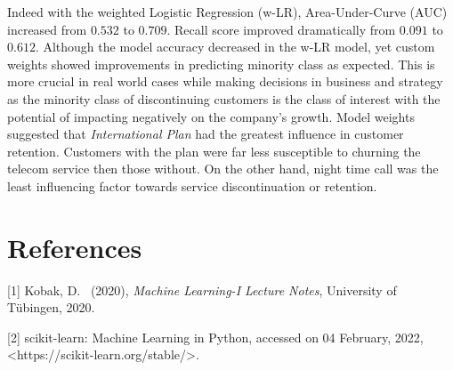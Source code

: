 \documentclass{article}
\begin{document}
Indeed with the weighted Logistic Regression (w-LR), Area-Under-Curve (AUC) increased from $0.532$ to $0.709$. Recall score improved dramatically from $0.091$ to $0.612$. Although the model accuracy decreased in the w-LR model, yet custom weights showed improvements in predicting minority class as expected. This is more crucial in real world cases while making decisions in business and strategy as the minority class of discontinuing customers is the class of interest with the potential of impacting negatively on the company's growth. Model weights suggested that \textit{International Plan} had the greatest influence in customer retention. Customers with the plan were far less susceptible to churning the telecom service then those without. On the other hand, night time call was the least influencing factor towards service discontinuation or retention.

\section*{References}

{
	\small
	
	[1] Kobak, D. \ (2020), \textit{Machine Learning-I Lecture Notes}, University of Tübingen, 2020.
	
	[2] scikit-learn: Machine Learning in Python, accessed on 04 February, 2022, <https://scikit-learn.org/stable/>.
	

}
\end{document}
